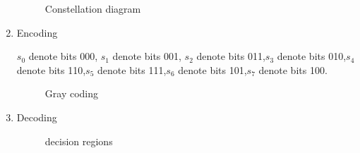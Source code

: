 \begin{enumerate}[label=\thesubsection.\arabic*.,ref=\thesubsection.\theenumi]
\begin{figure}[!ht]
                \resizebox{\columnwidth}{!}{}
\label{fig:ee18btech11012_fig1}
\caption{Constellation diagram}
\end{figure}


\item Encoding

$s_0$ denote bits 000, $s_1$ denote bits 001, $s_2$ denote bits 011,$s_3$ denote bits 010,$s_4$ denote bits 110,$s_5$ denote bits 111,$s_6$ denote bits 101,$s_7$ denote bits 100.
\begin{figure}[!ht]
                \resizebox{\columnwidth}{!}{}
\label{fig:ee18btech11012_fig2}
\caption{Gray coding}
\end{figure}

\item Decoding



\begin{figure}[!ht]

                \resizebox{\columnwidth}{!}{}

\label{fig:ee18btech11012_fig3}
\caption{decision regions}
	
\end{figure}


\end{enumerate}
